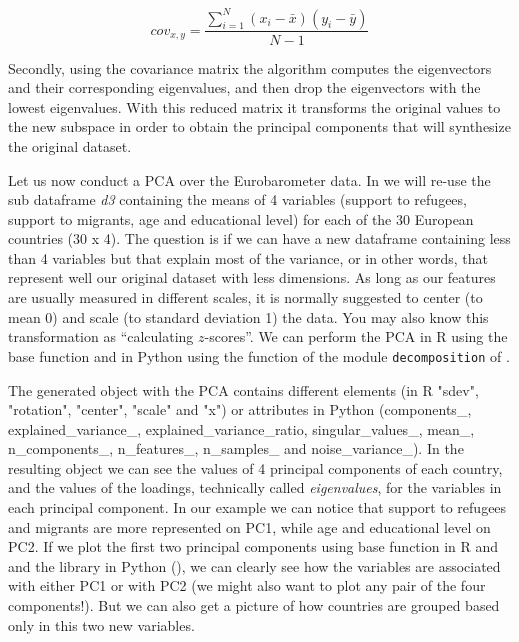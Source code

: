 $$cov_{x,y}=\frac{\sum_{i=1}^{N}(x_{i}-\bar{x})(y_{i}-\bar{y})}{N-1}$$

Secondly, using the covariance matrix the algorithm computes the eigenvectors and their corresponding eigenvalues, and then drop the eigenvectors with the lowest eigenvalues. With this reduced matrix it transforms the original values to the new subspace in order to obtain the principal components that will synthesize the original dataset.

Let us now conduct a PCA over the Eurobarometer data.  In  we will re-use the sub dataframe \emph{d3} containing the means of 4 variables (support to refugees, support to migrants, age and educational level) for each of the 30 European countries (30 x 4). The question is if we can have a new dataframe containing less than 4 variables but that explain most of the variance, or in other words, that represent well our original dataset with less dimensions. As long as our features are usually measured in different scales, it is normally suggested to center (to mean 0) and scale (to standard deviation 1) the data. You may also know this transformation as ``calculating $z$-scores''. We can perform the PCA in R using the base function  and in Python using the function  of the module \texttt{decomposition} of . 


The generated object with the PCA contains different elements (in R "sdev",     "rotation", "center",  "scale" and   "x") or attributes in Python (components\_, explained\_variance\_, explained\_variance\_ratio, singular\_values\_, mean\_, n\_components\_, n\_features\_, n\_samples\_ and noise\_variance\_). In the resulting object we can see the values of 4 principal components of each country, and the values of the loadings, technically called \textit{eigenvalues}, for the variables in each principal component. In our example we can notice that support to refugees and migrants are more represented on PC1, while age and educational level on PC2. If we plot the first two principal components using base function  in R and and the library  in Python (), we can clearly see how the variables are associated with either PC1 or with PC2 (we might also want to plot any pair of the four components!). But we can also get a picture of how countries are grouped based only in this two new variables.

